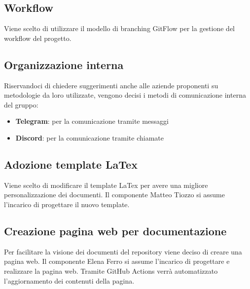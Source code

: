 \documentclass[italian,12pt]{article} %
\begin{document}
\subsection{Workflow}
\begin{flushleft}
	Viene scelto di utilizzare il modello di branching GitFlow per la gestione del workflow del progetto.
\end{flushleft}
\subsection{Organizzazione interna}
\begin{flushleft}
	Riservandoci di chiedere suggerimenti anche alle aziende proponenti su metodologie da loro utilizzate, vengono decisi i metodi di comunicazione interna del gruppo:
	\begin{itemize}
		\item \textbf{Telegram}: per la comunicazione tramite messaggi
		\item \textbf{Discord}: per la comunicazione tramite chiamate
	\end{itemize}
\end{flushleft}
\subsection{Adozione template LaTex}
\begin{flushleft}
	Viene scelto di modificare il template LaTex per avere una migliore personalizzazione dei documenti. Il componente Matteo Tiozzo si assume l'incarico di progettare il nuovo template. 
\end{flushleft}
\subsection{Creazione pagina web per documentazione}
\begin{flushleft}
	Per facilitare la visione dei documenti del repository viene deciso di creare una pagina web. Il componente Elena Ferro si assume l'incarico di progettare e realizzare la pagina web. Tramite GitHub Actions verrà automatizzato l'aggiornamento dei contenuti della pagina.
\end{flushleft}
\end{document}
